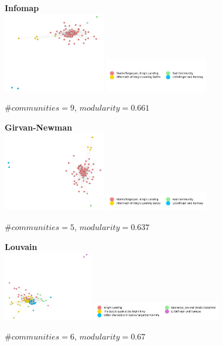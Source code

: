 \documentclass[10pt,twocolumn,letterpaper]{article}
\begin{document}
\begin{figure}[!h]
    \centering
    \textbf{Infomap}  \\
    \includegraphics[width=0.4\textwidth]{img/s8/communities_infomap.jpg}
    \includegraphics[width=0.4\textwidth]{img/s8/infomap_legend.jpg}\\
    \caption{\small{$\#communities=9$, $modularity=0.661$}}
    \label{fig:infomap_s8}
\end{figure}




\begin{figure}[!h]
    \centering
    \textbf{Girvan-Newman} \\
    \includegraphics[width=0.4\textwidth]{img/s8/communities_g-n.jpg}
    \includegraphics[width=0.4\textwidth]{img/s8/g-n_legend.jpg}\\
    \caption{\small{$\#communities=5$, $modularity=0.637$}}
    \label{fig:gn_s8}
\end{figure}


\begin{figure}[!h]
    \centering
    \textbf{Louvain} \\
    \includegraphics[width=0.35\textwidth]{img/s8/communities_louvain.jpg}
    \includegraphics[width=0.5\textwidth]{img/s8/louvain_legend.jpg}\\
    \caption{\small{$\#communities=6$, $modularity=0.67$}}
    \label{fig:louvain_s8}
\end{figure}
\end{document}
